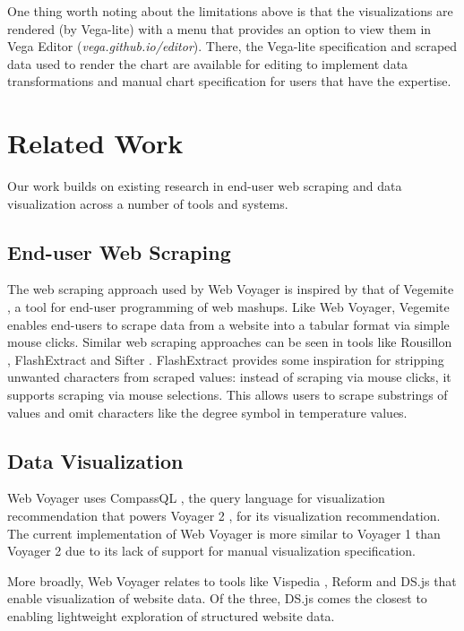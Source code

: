 \documentclass{vgtc}                          %
\begin{document}
One thing worth noting about the limitations above is that the visualizations are rendered (by Vega-lite) 
with a menu that provides an option to view them in Vega Editor (\emph{vega.github.io/editor}). There, the
Vega-lite specification and scraped data used to render the chart are available for editing to implement 
data transformations and manual chart specification for users that have the expertise.

\section{Related Work} \label{related-work}

Our work builds on existing research in end-user web scraping and data
visualization across a number of tools and systems.

\subsection{End-user Web Scraping}

The web scraping approach used by Web Voyager is inspired by that of
Vegemite \cite{lin2009}, a tool for end-user programming of web
mashups. Like Web Voyager, Vegemite enables end-users to scrape data
from a website into a tabular format via simple mouse clicks. Similar
web scraping approaches can be seen in tools like Rousillon
\cite{chasins2018}, FlashExtract \cite{le2014} and Sifter \cite{huynh2006}. FlashExtract
provides some inspiration for stripping unwanted characters from scraped values: instead
of scraping via mouse clicks, it supports scraping via mouse selections. This allows users to
scrape substrings of values and omit characters like the degree symbol in temperature values.

\subsection{Data Visualization}

Web Voyager uses CompassQL \cite{wongsuphasawat2016}, the query
language for visualization recommendation that powers Voyager 2
\cite{wongsuphasawat2017}, for its visualization recommendation. The
current implementation of Web Voyager is more similar to Voyager 1 \cite{wongsuphasawat2016a} than
Voyager 2 due to its lack of support for manual visualization
specification.

More broadly, Web Voyager relates to tools like Vispedia
\cite{chan2008}, Reform \cite{toomim2009} and DS.js \cite{zhang2017}
that enable visualization of website data. Of the three, DS.js comes the
closest to enabling lightweight exploration of structured website
data.
\end{document}
